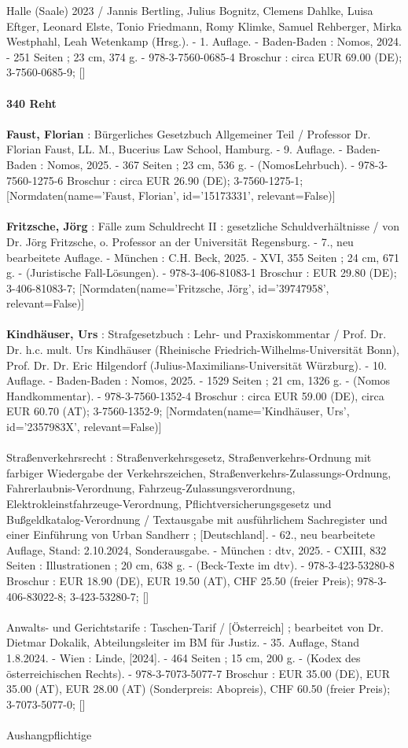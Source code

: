 \documentclass{article}
\begin{document}
\begin{multicols}{3}
Halle (Saale) 2023 / Jannis Bertling, Julius Bognitz, Clemens Dahlke, Luisa Eftger, Leonard Elste, Tonio Friedmann, Romy Klimke, Samuel Rehberger, Mirka Westphahl, Leah Wetenkamp (Hrsg.). - 1. Auflage. - Baden-Baden : Nomos, 2024. - 251 Seiten ; 23 cm, 374 g. - 978-3-7560-0685-4 Broschur : circa EUR 69.00 (DE); 3-7560-0685-9; []\\\\\textbf{340 Reht}\\\\\textbf{Faust, Florian} : Bürgerliches Gesetzbuch Allgemeiner Teil / Professor Dr. Florian Faust, LL. M., Bucerius Law School, Hamburg. - 9. Auflage. - Baden-Baden : Nomos, 2025. - 367 Seiten ; 23 cm, 536 g. - (NomosLehrbuch). - 978-3-7560-1275-6 Broschur : circa EUR 26.90 (DE); 3-7560-1275-1; [Normdaten(name='Faust, Florian', id='15173331', relevant=False)]\\\\\textbf{Fritzsche, Jörg} : Fälle zum Schuldrecht II : gesetzliche Schuldverhältnisse / von Dr. Jörg Fritzsche, o. Professor an der Universität Regensburg. - 7., neu bearbeitete Auflage. - München : C.H. Beck, 2025. - XVI, 355 Seiten ; 24 cm, 671 g. - (Juristische Fall-Lösungen). - 978-3-406-81083-1 Broschur : EUR 29.80 (DE); 3-406-81083-7; [Normdaten(name='Fritzsche, Jörg', id='39747958', relevant=False)]\\\\\textbf{Kindhäuser, Urs} : Strafgesetzbuch : Lehr- und Praxiskommentar / Prof. Dr. Dr. h.c. mult. Urs Kindhäuser (Rheinische Friedrich-Wilhelms-Universität Bonn), Prof. Dr. Dr. Eric Hilgendorf (Julius-Maximilians-Universität Würzburg). - 10. Auflage. - Baden-Baden : Nomos, 2025. - 1529 Seiten ; 21 cm, 1326 g. - (Nomos Handkommentar). - 978-3-7560-1352-4 Broschur : circa EUR 59.00 (DE), circa EUR 60.70 (AT); 3-7560-1352-9; [Normdaten(name='Kindhäuser, Urs', id='2357983X', relevant=False)]\\\\Straßenverkehrsrecht : Straßenverkehrsgesetz, Straßenverkehrs-Ordnung mit farbiger Wiedergabe der Verkehrszeichen, Straßenverkehrs-Zulassungs-Ordnung, Fahrerlaubnis-Verordnung, Fahrzeug-Zulassungsverordnung, Elektrokleinstfahrzeuge-Verordnung, Pflichtversicherungsgesetz und Bußgeldkatalog-Verordnung / Textausgabe mit ausführlichem Sachregister und einer Einführung von Urban Sandherr ; [Deutschland]. - 62., neu bearbeitete Auflage, Stand: 2.10.2024, Sonderausgabe. - München : dtv, 2025. - CXIII, 832 Seiten : Illustrationen ; 20 cm, 638 g. - (Beck-Texte im dtv). - 978-3-423-53280-8 Broschur : EUR 18.90 (DE), EUR 19.50 (AT), CHF 25.50 (freier Preis); 978-3-406-83022-8; 3-423-53280-7; []\\\\Anwalts- und Gerichtstarife : Taschen-Tarif / [Österreich] ; bearbeitet von Dr. Dietmar Dokalik, Abteilungsleiter im BM für Justiz. - 35. Auflage, Stand 1.8.2024. - Wien : Linde, [2024]. - 464 Seiten ; 15 cm, 200 g. - (Kodex des österreichischen Rechts). - 978-3-7073-5077-7 Broschur : EUR 35.00 (DE), EUR 35.00 (AT), EUR 28.00 (AT) (Sonderpreis: Abopreis), CHF 60.50 (freier Preis); 3-7073-5077-0; []\\\\Aushangpflichtige 
\end{multicols}
\end{document}
